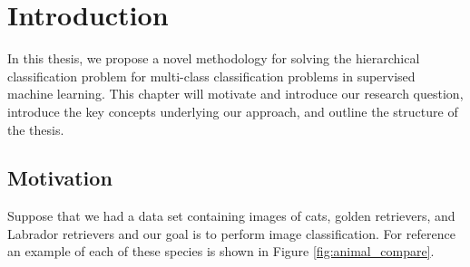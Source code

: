 \documentclass[draft, ../thesis.tex]{subfiles}
\begin{document}
    \chapter{Introduction}

    In this thesis, we propose a novel methodology for solving the hierarchical
    classification problem for multi-class classification problems in supervised
    machine learning. This chapter will motivate and introduce our research
    question, introduce the key concepts underlying our approach, and outline
    the structure of the thesis.
    \section{Motivation}
    \label{motivation}
    Suppose that we had a data set containing images of cats, golden retrievers,
    and Labrador retrievers and our goal is to perform image classification. For
    reference an example of each of these species is shown in Figure
    \ref{fig:animal_compare}.
\end{document}
